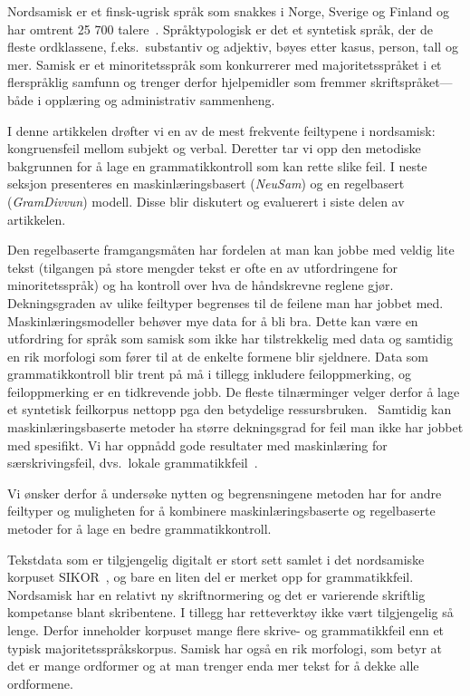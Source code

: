 \documentclass{flammie}
\begin{document}
Nordsamisk er et finsk-ugrisk språk som snakkes i Norge, Sverige og Finland og
har omtrent 25 700 talere~\cite{Ethnologue2018}.  Språktypologisk er det et
syntetisk språk, der de fleste ordklassene, f.eks.\ substantiv og adjektiv,
bøyes etter kasus, person, tall og mer.  Samisk er et minoritetsspråk som
konkurrerer med majoritetsspråket i et flerspråklig samfunn og trenger derfor
hjelpemidler som fremmer skriftspråket---både i opplæring og administrativ
sammenheng.

I denne artikkelen drøfter vi en av de mest frekvente feiltypene i nordsamisk:
kongruensfeil mellom subjekt og verbal.  Deretter tar vi opp den metodiske
bakgrunnen for å lage en grammatikkontroll som kan rette slike feil.  I neste
seksjon presenteres en maskinlæringsbasert (\textit{NeuSam}) og en regelbasert
(\textit{GramDivvun}) modell.  Disse blir diskutert og evaluerert i siste delen
av artikkelen.

Den regelbaserte framgangsmåten har fordelen at man kan jobbe med veldig lite
tekst (tilgangen på store mengder tekst er ofte en av utfordringene for
minoritetsspråk) og ha kontroll over hva de håndskrevne reglene gjør.
Dekningsgraden av ulike feiltyper begrenses til de feilene man har jobbet med.
Maskinlæringsmodeller behøver mye data for å bli bra. Dette kan være en
utfordring for språk som samisk som ikke har tilstrekkelig med data og samtidig
en rik morfologi som fører til at de enkelte formene blir sjeldnere.  Data som
grammatikkontroll blir trent på må i tillegg inkludere feiloppmerking, og
feiloppmerking er en tidkrevende jobb. De fleste tilnærminger velger derfor å
lage et syntetisk feilkorpus nettopp pga den betydelige
ressursbruken.~\cite{Milkowski2007automated,dahlmeier-etal-2013-building}
Samtidig kan maskinlæringsbaserte metoder ha større dekningsgrad for feil man
ikke har jobbet med spesifikt. Vi har oppnådd gode resultater med maskinlæring
for særskrivingsfeil, dvs.\ lokale
grammatikkfeil~\cite{Wiechetek-etal-2021-rules}.

Vi ønsker derfor å undersøke nytten og begrensningene metoden har for andre
feiltyper og muligheten for å  kombinere maskinlæringsbaserte og regelbaserte
metoder for å lage en bedre grammatikkontroll.


Tekstdata som er tilgjengelig digitalt er stort sett samlet i det nordsamiske
korpuset SIKOR~\cite{sikor_06.11.2018}, og bare en liten del er merket opp for
grammatikkfeil.  Nordsamisk har en relativt ny skriftnormering og det er
varierende skriftlig kompetanse blant skribentene. I tillegg har retteverktøy
ikke vært tilgjengelig så lenge. Derfor inneholder korpuset mange flere skrive-
og grammatikkfeil enn et typisk majoritetsspråkskorpus.  Samisk har også en rik
morfologi, som betyr at det er mange ordformer og at man trenger enda mer tekst
for å dekke alle ordformene.
\end{document}
